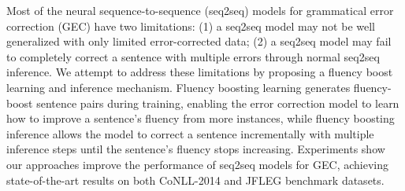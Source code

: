 Most of the neural sequence-to-sequence (seq2seq) models for grammatical error correction (GEC) have two limitations: (1) a seq2seq model may not be well generalized with only limited error-corrected data; (2) a seq2seq model may fail to completely correct a sentence with multiple errors through normal seq2seq inference. We attempt to address these limitations by proposing a fluency boost learning and inference mechanism. Fluency boosting learning generates fluency-boost sentence pairs during training, enabling the error correction model to learn how to improve a sentence's fluency from more instances, while fluency boosting inference allows the model to correct a sentence incrementally with multiple inference steps until the sentence's fluency stops increasing. Experiments show our approaches improve the performance of seq2seq models for GEC, achieving state-of-the-art results on both CoNLL-2014 and JFLEG benchmark datasets.
